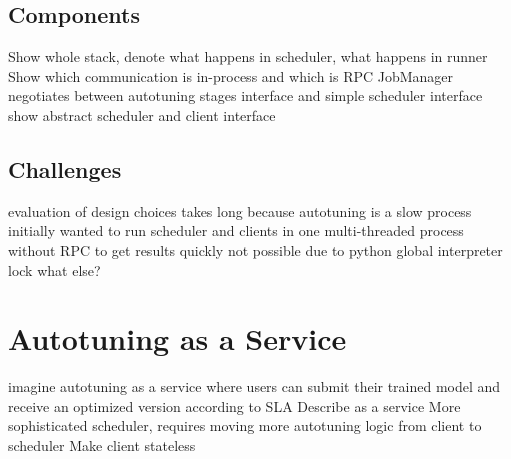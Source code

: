 \subsection{Components}
Show whole stack, denote what happens in scheduler, what happens in runner
Show which communication is in-process and which is RPC
JobManager negotiates between autotuning stages interface and simple scheduler interface
show abstract scheduler and client interface

\subsection{Challenges}
evaluation of design choices takes long because autotuning is a slow process
initially wanted to run scheduler and clients in one multi-threaded process without RPC to get results quickly
not possible due to python global interpreter lock
what else?

\section{Autotuning as a Service}
imagine autotuning as a service where users can submit their trained model and receive an optimized version according to SLA
Describe as a service
More sophisticated scheduler, requires moving more autotuning logic from client to scheduler
Make client stateless